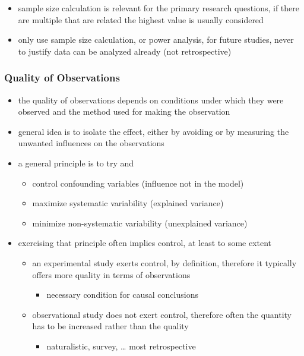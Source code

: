 \documentclass[]{article}
\providecommand{\tightlist}{%
  \setlength{\itemsep}{0pt}\setlength{\parskip}{0pt}}
\begin{document}
\begin{itemize}
\begin{itemize}
    \begin{itemize}
    \tightlist
    \item
      sample size calculation is relevant for the primary research
      questions, if there are multiple that are related the highest
      value is usually considered
    \item
      only use sample size calculation, or power analysis, for future
      studies, never to justify data can be analyzed already (not
      retrospective)
    \end{itemize}
  \end{itemize}
\end{itemize}

\subsubsection{Quality of Observations}\label{quality-of-observations}

\begin{itemize}
\tightlist
\item
  the quality of observations depends on conditions under which they
  were observed and the method used for making the observation 
\item
  general idea is to isolate the effect, either by avoiding or by
  measuring the unwanted influences on the observations
\item
  a general principle is to try and

  \begin{itemize}
  \tightlist
  \item
    control confounding variables (influence not in the model)
  \item
    maximize systematic variability (explained variance)
  \item
    minimize non-systematic variability (unexplained variance) \\
  \end{itemize}
\item
  exercising that principle often implies control, at least to some
  extent

  \begin{itemize}
  \tightlist
  \item
    an experimental study exerts control, by definition, therefore it
    typically offers more quality in terms of observations

    \begin{itemize}
    \tightlist
    \item
      necessary condition for causal conclusions
    \end{itemize}
  \item
    observational study does not exert control, therefore often the
    quantity has to be increased rather than the quality

    \begin{itemize}
    \tightlist
    \item
      naturalistic, survey, \ldots{} most retrospective
    \end{itemize}
  \end{itemize}
\end{itemize}
\end{document}
